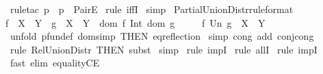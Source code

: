 \begin{isabellebody}
\ {\isacharparenleft}rule{\isacharunderscore}tac\ p\ {\isacharequal}\ {\isachardoublequoteopen}p{\isachardoublequoteclose}\ \ PairE{\isacharparenright}\isanewline
{}\isamarkupfalse%
\ {\isacharparenleft}rule\ iffI{\isacharparenright}\isanewline
{}\isamarkupfalse%
\ simp{\isacharplus}\isanewline
{}\isamarkupfalse%
%
\endisatagproof
{\isafoldproof}%
%
\isadelimproof
\isanewline
%
\endisadelimproof
\isanewline
{}\isamarkupfalse%
\ Partial{\isacharunderscore}Union{\isacharunderscore}Distr{\isacharbrackleft}rule{\isacharunderscore}format{\isacharbrackright}{\isacharcolon}\ \isanewline
{\isachardoublequoteopen}{\isacharparenleft}f\ {\isacharcolon}\ {\isacharparenleft}X\ {\isacharminus}{\isacharbar}{\isacharminus}{\isachargreater}\ Y{\isacharparenright}\ {\isacharampersand}\ g\ {\isacharcolon}\ {\isacharparenleft}X\ {\isacharminus}{\isacharbar}{\isacharminus}{\isachargreater}\ Y{\isacharparenright}\ {\isacharampersand}\ {\isacharparenleft}dom\ f\ Int\ dom\ g{\isacharparenright}\ {\isacharequal}\ {\isacharbraceleft}{\isacharbraceright}{\isacharparenright}\ \isanewline
\ {\isacharminus}{\isacharminus}{\isachargreater}\ {\isacharparenleft}f\ Un\ g\ {\isacharcolon}\ {\isacharparenleft}X\ {\isacharminus}{\isacharbar}{\isacharminus}{\isachargreater}\ Y{\isacharparenright}{\isacharparenright}{\isachardoublequoteclose}\isanewline
%
\isadelimproof
%
\endisadelimproof
%
\isatagproof
{}\isamarkupfalse%
\ {\isacharparenleft}unfold\ pfun{\isacharunderscore}def\ dom{\isacharunderscore}simp\ {\isacharbrackleft}THEN\ eq{\isacharunderscore}reflection{\isacharbrackright}{\isacharparenright}\isanewline
{}\isamarkupfalse%
\ {\isacharparenleft}simp\ cong\ add{\isacharcolon}\ conj{\isacharunderscore}cong{\isacharparenright}\isanewline
{}\isamarkupfalse%
\ {\isacharparenleft}rule\ Rel{\isacharunderscore}Union{\isacharunderscore}Distr\ {\isacharbrackleft}THEN\ subst{\isacharbrackright}{\isacharparenright}\isanewline
{}\isamarkupfalse%
\ simp\isanewline
{}\isamarkupfalse%
\ {\isacharparenleft}rule\ impI{\isacharparenright}\isanewline
{}\isamarkupfalse%
\ {\isacharparenleft}rule\ allI{\isacharparenright}{\isacharplus}\isanewline
{}\isamarkupfalse%
\ {\isacharparenleft}rule\ impI{\isacharparenright}\isanewline
{}\isamarkupfalse%
\ {\isacharparenleft}fast\ elim{\isacharcolon}\ equalityCE{\isacharparenright}\isanewline
{}\isamarkupfalse%
%
\endisatagproof
{\isafoldproof}%

\end{isabellebody}
